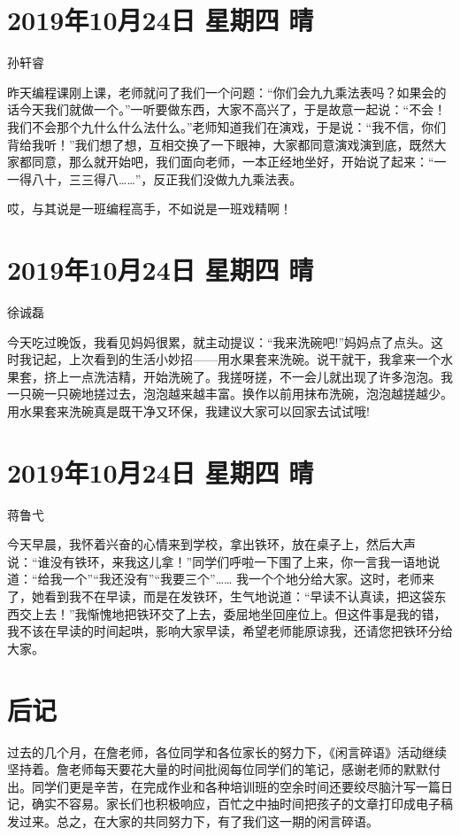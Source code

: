 \section{2019年10月24日 星期四 晴}

孙轩睿

昨天编程课刚上课，老师就问了我们一个问题：“你们会九九乘法表吗？如果会的话今天我们就做一个。”一听要做东西，大家不高兴了，于是故意一起说：“不会！我们不会那个九什么什么法什么。”老师知道我们在演戏，于是说：“我不信，你们背给我听！”我们想了想，互相交换了一下眼神，大家都同意演戏演到底，既然大家都同意，那么就开始吧，我们面向老师，一本正经地坐好，开始说了起来：“一一得八十，三三得八……”，反正我们没做九九乘法表。

哎，与其说是一班编程高手，不如说是一班戏精啊！

\section{2019年10月24日 星期四 晴}

徐诚磊

今天吃过晚饭，我看见妈妈很累，就主动提议：“我来洗碗吧!”妈妈点了点头。这时我记起，上次看到的生活小妙招——用水果套来洗碗。说干就干，我拿来一个水果套，挤上一点洗洁精，开始洗碗了。我搓呀搓，不一会儿就出现了许多泡泡。我一只碗一只碗地搓过去，泡泡越来越丰富。换作以前用抹布洗碗，泡泡越搓越少。用水果套来洗碗真是既干净又环保，我建议大家可以回家去试试哦!

\section{2019年10月24日 星期四 晴}

蒋鲁弋

今天早晨，我怀着兴奋的心情来到学校，拿出铁环，放在桌子上，然后大声说：“谁没有铁环，来我这儿拿！”同学们呼啦一下围了上来，你一言我一语地说道：“给我一个”“我还没有”“我要三个”…… 我一个个地分给大家。这时，老师来了，她看到我不在早读，而是在发铁环，生气地说道：“早读不认真读，把这袋东西交上去！”我惭愧地把铁环交了上去，委屈地坐回座位上。但这件事是我的错，我不该在早读的时间起哄，影响大家早读，希望老师能原谅我，还请您把铁环分给大家。

\section{后记}

过去的几个月，在詹老师，各位同学和各位家长的努力下，《闲言碎语》活动继续坚持着。詹老师每天要花大量的时间批阅每位同学们的笔记，感谢老师的默默付出。同学们更是辛苦，在完成作业和各种培训班的空余时间还要绞尽脑汁写一篇日记，确实不容易。家长们也积极响应，百忙之中抽时间把孩子的文章打印成电子稿发过来。总之，在大家的共同努力下，有了我们这一期的闲言碎语。

